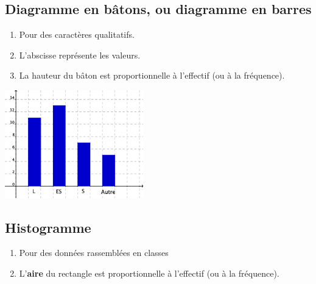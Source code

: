 \subsection{Diagramme en bâtons, ou diagramme en barres}


\begin{multicols}{2}
\begin{enumerate}
\item Pour des caractères qualitatifs.
\item L'abscisse représente les valeurs.
\item La hauteur du bâton est proportionnelle à l'effectif (ou à la fréquence).
\end{enumerate}

\medskip
{}
\columnbreak
  \begin{center}
    \includegraphics[width=6cm]{Stats_Fig4_DiagBaton.png}
  \end{center}    
\end{multicols}




\subsection{Histogramme}

\begin{enumerate}
\item Pour des données rassemblées en classes
\item L'\textbf{aire} du rectangle est proportionnelle à l'effectif (ou à la
fréquence). 
\end{enumerate}

